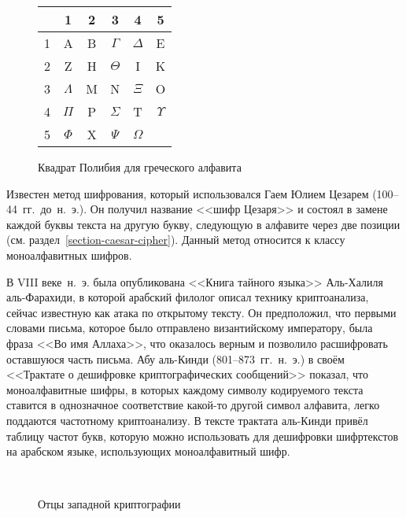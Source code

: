 \begin{figure}[t]
	\centering
\begin{tabular}{ || c || c | c | c | c | c ||}
\hline
\hline
  & 1 & 2 & 3 & 4 & 5 \\
\hline
\hline
1 & A & B & $\Gamma$ & $\Delta$ & E \\
\hline
2 & Z & H & $\Theta$ & I & K \\
\hline
3 & $\Lambda$ & M & N & $\Xi$ & O  \\
\hline
4 & $\Pi$ & P & $\Sigma$ & T & $\Upsilon$ \\
\hline
5 & $\Phi$ & X & $\Psi$ & $\Omega$ & \\
\hline
\hline
\end{tabular}
  \caption{Квадрат Полибия для греческого алфавита}
  \label{fig:polubios-square}
\end{figure}

Известен метод шифрования, который использовался Гаем Юлием Цезарем (100--44~гг.~до~н.~э.). Он получил название <<шифр Цезаря>> и состоял в замене каждой буквы текста на другую букву, следующую в алфавите через две позиции (см. раздел~\ref{section-caesar-cipher}). Данный метод относится к классу моноалфавитных шифров.

В VIII веке~н.~э. была опубликована <<Книга тайного языка>> Аль-Халиля аль-Фарахиди, в которой арабский филолог описал технику криптоанализа, сейчас известную как атака по открытому тексту. Он предположил, что первыми словами письма, которое было отправлено византийскому императору, была фраза <<Во имя Аллаха>>, что оказалось верным и позволило расшифровать оставшуюся часть письма. Абу аль-Кинди (801--873~гг.~н.~э.) в своём <<Трактате о дешифровке криптографических сообщений>> показал, что моноалфавитные шифры, в которых каждому символу кодируемого текста ставится в однозначное соответствие какой-то другой символ алфавита, легко поддаются частотному криптоанализу. В тексте трактата аль-Кинди привёл таблицу частот букв, которую можно использовать для дешифровки шифртекстов на арабском языке, использующих моноалфавитный шифр.

\begin{figure}[t]
	\centering
	~
	\caption{Отцы западной криптографии}
\end{figure}

